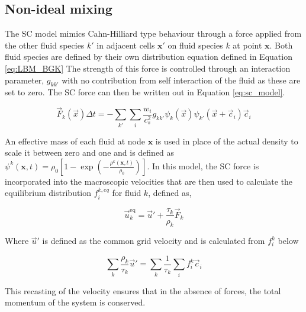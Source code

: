 \subsection{Non-ideal mixing}
\label{section:lbm_non_ideal_mixing}

The SC model mimics Cahn-Hilliard type behaviour through a force applied from the other fluid species $k'$ in adjacent 
cells $\mathbf{x'}$ on fluid species $k$ at point $\mathbf{x}$. \cite{shan_lattice_1993, shan_simulation_1994, 
shan_multicomponent_1995, he_discrete_1998, jansen_bijels_2011, chin_lattice_2002} Both fluid species are defined
by their own distribution equation defined in Equation \ref{eq:LBM_BGK} The strength of this force is controlled 
through an interaction parameter, $g_{kk'}$ with no contribution from self interaction of the fluid as these are 
set to zero. The SC force can then be written out in Equation \ref{eq:sc_model}.

\begin{equation}
\vec{F}_k(\vec{x}) \Delta t = - \sum_{k'} \sum_i \frac{w_i}{c_s^2} g_{kk'} \psi_k(\vec{x})\psi_{k'}(\vec{x}+\vec{c}_i) \vec{c}_i
\label{eq:sc_model}
\end{equation}

An effective mass of each fluid at node $\mathbf{x}$ is used in place of the actual density to scale it between zero 
and one and is defined as $\psi^{k}(\mathbf{x},t) = \rho_{0}\left[1 - \exp(-\frac{\rho^{k}(\mathbf{x}, t)}{\rho_{0}})\right]$. 
In this model, the SC force is incorporated into the macroscopic velocities that are then used to calculate the equilibrium
distribution $f_{i}^{k, eq}$ for fluid $k$, defined as,

\begin{equation}
\vec{u}_k^{\text{eq}} = \vec{u}' + \frac{\tau_k}{\rho_k} \vec{F}_k
\end{equation}

Where $\vec{u}'$ is defined as the common grid velocity and is calculated from $f_i^k$ below

\begin{equation}
    \sum_k \frac{\rho_k}{\tau_k} \vec{u}' = \sum_k \frac{1}{\tau_k}\sum_i f_i^k\vec{c}_i
\end{equation}

This recasting of the velocity ensures that in the absence of forces, the total momentum of the system is conserved. 

